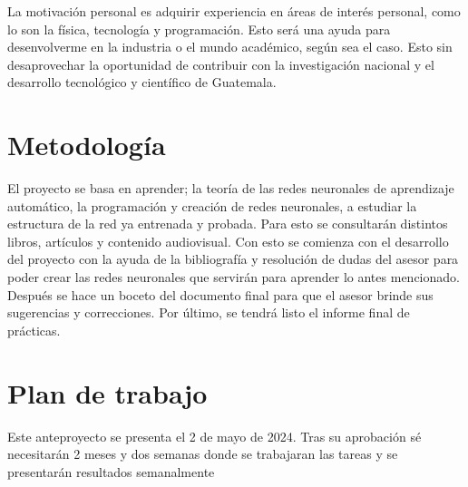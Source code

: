 \documentclass[titlepage,11pt]{article}
\begin{document}
La motivación personal es adquirir experiencia en áreas de interés personal, como lo son la física, tecnología y programación. Esto será una ayuda para desenvolverme en la industria o el mundo académico, según sea el caso. Esto sin desaprovechar la oportunidad de contribuir con la investigación nacional y el desarrollo tecnológico y científico de Guatemala. 




\section{Metodología}
\label{sec:metodologia}
El proyecto se basa en aprender; la teoría de las redes neuronales de aprendizaje automático, la programación y creación de redes neuronales, a estudiar la estructura de la red ya entrenada y probada.  Para esto se consultarán distintos libros, artículos y contenido audiovisual. Con esto se comienza con el desarrollo del proyecto con la ayuda de la bibliografía y resolución de dudas del asesor para poder crear las redes neuronales que servirán para aprender lo antes mencionado. Después se hace un boceto del documento final para que el asesor brinde sus sugerencias y correcciones. Por último, se tendrá listo el informe final de prácticas. 

\section{Plan de trabajo}
\label{sec:plan}

Este anteproyecto se presenta el 2 de mayo de 2024.  Tras su aprobación sé
necesitarán 2 meses y dos semanas donde se trabajaran las tareas y se presentarán resultados
semanalmente
\end{document}
